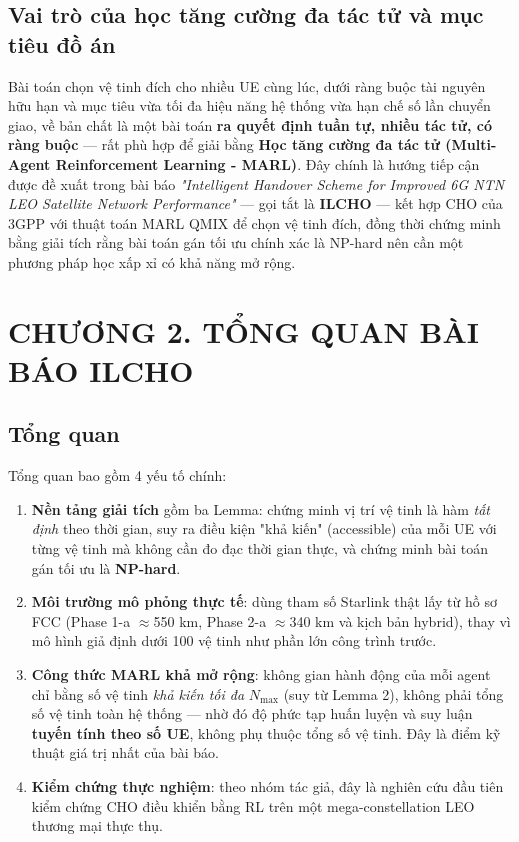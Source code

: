 \documentclass{article} %
\begin{document}
\subsection{Vai trò của học tăng cường đa tác tử và mục tiêu đồ án}
Bài toán chọn vệ tinh đích cho nhiều UE cùng lúc, dưới ràng buộc tài nguyên hữu hạn và mục tiêu vừa tối đa hiệu năng hệ thống vừa hạn chế số lần chuyển giao, về bản chất là một bài toán \textbf{ra quyết định tuần tự, nhiều tác tử, có ràng buộc} — rất phù hợp để giải bằng \textbf{Học tăng cường đa tác tử (Multi-Agent Reinforcement Learning - MARL)}. Đây chính là hướng tiếp cận được đề xuất trong bài báo \textit{"Intelligent Handover Scheme for Improved 6G NTN LEO Satellite Network Performance"} \cite{choi2026ilcho} — gọi tắt là \textbf{ILCHO} — kết hợp CHO của 3GPP với thuật toán MARL QMIX để chọn vệ tinh đích, đồng thời chứng minh bằng giải tích rằng bài toán gán tối ưu chính xác là NP-hard nên cần một phương pháp học xấp xỉ có khả năng mở rộng.


\newpage
\section*{CHƯƠNG 2. TỔNG QUAN BÀI BÁO ILCHO}
\setcounter{section}{2}
\setcounter{subsection}{0}
\setcounter{figure}{0}
\setcounter{table}{0}

\subsection{Tổng quan}
Tổng quan bao gồm 4 yếu tố chính:
\begin{enumerate}
    \item \textbf{Nền tảng giải tích} gồm ba Lemma: chứng minh vị trí vệ tinh là hàm \emph{tất định} theo thời gian, suy ra điều kiện "khả kiến" (accessible) của mỗi UE với từng vệ tinh mà không cần đo đạc thời gian thực, và chứng minh bài toán gán tối ưu là \textbf{NP-hard}.
    \item \textbf{Môi trường mô phỏng thực tế}: dùng tham số Starlink thật lấy từ hồ sơ FCC (Phase 1-a $\approx$550 km, Phase 2-a $\approx$340 km và kịch bản hybrid), thay vì mô hình giả định dưới 100 vệ tinh như phần lớn công trình trước.
    \item \textbf{Công thức MARL khả mở rộng}: không gian hành động của mỗi agent chỉ bằng số vệ tinh \emph{khả kiến tối đa} $N_{\max}$ (suy từ Lemma 2), không phải tổng số vệ tinh toàn hệ thống — nhờ đó độ phức tạp huấn luyện và suy luận \textbf{tuyến tính theo số UE}, không phụ thuộc tổng số vệ tinh. Đây là điểm kỹ thuật giá trị nhất của bài báo.
    \item \textbf{Kiểm chứng thực nghiệm}: theo nhóm tác giả, đây là nghiên cứu đầu tiên kiểm chứng CHO điều khiển bằng RL trên một mega-constellation LEO thương mại thực thụ.
\end{enumerate}
\end{document}
